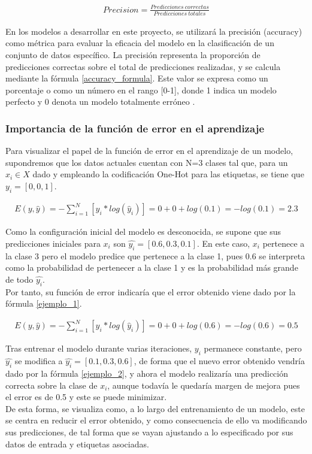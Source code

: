 \begin{gather}
	Precision = \frac{Predicciones\ correctas}{Predicciones\ totales}
	\label{accuracy_formula}
\end{gather}


En los modelos a desarrollar en este proyecto, se utilizará la precisión (accuracy) como métrica para evaluar la eficacia del modelo en la clasificación de un conjunto de datos específico. La precisión representa la proporción de predicciones correctas sobre el total de predicciones realizadas, y se calcula mediante la fórmula \ref{accuracy_formula}. Este valor se expresa como un porcentaje o como un número en el rango [0-1], donde 1 indica un modelo perfecto y 0 denota un modelo totalmente erróneo \cite{accuracy}. 

\subsubsection{Importancia de la función de error en el aprendizaje}

Para visualizar el papel de la función de error en el aprendizaje de un modelo, supondremos que los datos actuales cuentan con N=3 clases tal que, para un $x_i \in X$ dado y empleando la codificación One-Hot para las etiquetas, se tiene que $y_i = [0, 0, 1]$. 

\begin{gather}
	E(y, \hat{y}) = - \sum_{i=1}^{N}  [y_i * log( \hat{y}_i)] = 0 + 0 + log(0.1) = -log(0.1) = 2.3
	\label{ejemplo_1}
\end{gather}

Como la configuración inicial del modelo es desconocida, se supone que sus predicciones iniciales para $x_i$ son $\hat{y_i} = [ 0.6, 0.3, 0.1]$. En este caso, $x_i$ pertenece a la clase 3 pero el modelo predice que pertenece a la clase 1, pues 0.6 se interpreta como la probabilidad de pertenecer a la clase 1 y es la probabilidad más grande de todo $\hat{y_i}$.\\
Por tanto, su función de error indicaría que el error obtenido viene dado por la fórmula \ref{ejemplo_1}.

\begin{gather}
	E(y, \hat{y}) = - \sum_{i=1}^{N}  [y_i * log( \hat{y}_i)] = 0 + 0 + log(0.6) = -log(0.6) = 0.5
	\label{ejemplo_2}
\end{gather}

Tras entrenar el modelo durante varias iteraciones, $y_i$ permanece constante, pero $\hat{y_i}$ se modifica a $\hat{y_i} = [0.1, 0.3, 0.6]$, de forma que el nuevo error obtenido vendría dado por la fórmula \ref{ejemplo_2}, y ahora el modelo realizaría una predicción correcta sobre la clase de $x_i$, aunque todavía le quedaría margen de mejora pues el error es de 0.5 y este se puede minimizar. \\
De esta forma, se visualiza como, a lo largo del entrenamiento de un modelo, este se centra en reducir el error obtenido, y como consecuencia de ello va modificando sus predicciones, de tal forma que se vayan ajustando a lo especificado por sus datos de entrada y etiquetas asociadas.


